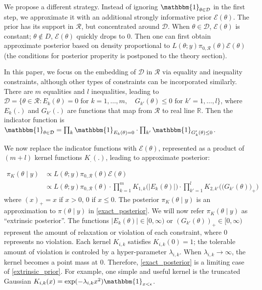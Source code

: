\documentclass[10pt]{article}
\newcommand{\mc}[1]{\mathcal{#1}}
\begin{document}
We propose a different strategy. Instead of ignoring $\mathbbm{1}_{\theta\in \mc D} $ in the first step, we approximate it with an additional strongly informative prior $\mc E(\theta)$. The prior has its support in $\mc R$, but concentrated around $\mc D$. When $\theta \in \mc D$, $\mc E(\theta)$ is constant; $\theta \not\in D$, $\mc E(\theta)$ quickly drops to $0$. Then one can first obtain approximate posterior based on density proportional to $L(\theta;y)\pi_{0,\mc R}(\theta)\mc E(\theta)$ (the conditions for posterior properity is postponed to the theory section).

In this paper, we focus on the embedding of $\mc D$ in $\mc R$ via equality and inequality constraints, although other types of constraints can be incorporated similarly. There are $m$ equalities and $l$ inequalities, leading to $\mc D = \{ \theta \in \mc R: E_k(\theta)=0 \text{ for } k=1,\ldots,m, \quad G_{k'}(\theta)\le 0  \text{ for } k'=1,\ldots,l \}$, where $E_k(.)$ and $G_{k'}(.)$ are functions that map from $\mc R$ to real line $\mathbb R$. Then the indicator function is $\mathbbm{1}_{\theta\in \mc D} = \prod_k \mathbbm{1}_{E_k(\theta)=0} \cdot \prod_{k'}\mathbbm{1}_{G_k'(\theta)\le 0}$.


We now replace the indicator functions with $\mc E(\theta)$, represented as a product of $(m+l)$ kernel functions $K_.(.)$, leading to approximate posterior:

\begin{equation}
\begin{aligned}
\label{extrinsic_prior}
\pi_{K}(\theta \mid y) & \propto L(\theta;y)\pi_{0,\mc R}(\theta) \mc E(\theta) \\
&\propto L(\theta;y)\pi_{0,\mc R}(\theta) \cdot \prod_{k=1}^{m} K_{1,k}\Big( | E_k(\theta)| \Big) \cdot \prod_{k'=1}^{l} K_{2,k'}\Big( \big( G_{k'}(\theta) \big)_+ \Big)
\end{aligned}
\end{equation}
where $(x)_+ = x$ if $x>0$, $0$ if $x\le 0$. The posterior $\pi_{K}(\theta \mid y)$ is an approximation to $\pi(\theta \mid y)$ in \eqref{exact_posterior}. We will now refer $\pi_{K}(\theta \mid y)$ as ``extrinsic posterior''. The functions $|E_k(\theta)|\in [0,\infty)$ or $(G_{k'}(\theta))_+ \in [0,\infty)$ represent the amount of relaxation or violation of each constraint, where $0$ represents no violation. Each kernel $K_{i,k}$ satisfies $K_{i,k}(0)=1$; the tolerable amount of violation is controled by a hyper-parameter $\lambda_{i,k}$. When $\lambda_{i,k} \rightarrow \infty$, the kernel becomes a point mass at $0$. Therefore, \eqref{exact_posterior} is a limiting case of \eqref{extrinsic_prior}. For example, one simple and useful kernel is the truncated Gaussian $K_{i,k}(x) = \exp( -{\lambda_{i,k} x^2}) \mathbbm{1}_{x<\epsilon}$.
\end{document}
